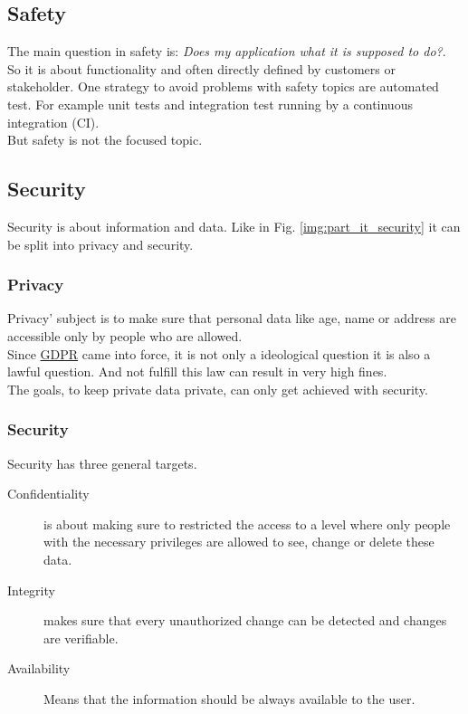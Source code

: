 \subsection{Safety}
\label{chp:intro:sec:definition:ssec:safety}

The main question in safety is: \textit{Does my application what it is supposed to do?}. \\
So it is about functionality and often directly defined by customers or stakeholder. One strategy to avoid problems with safety topics are automated test. For example unit tests and integration test running by a continuous integration (CI). \\
But safety is not the focused topic.

\subsection{Security}
\label{chp:intro:sec:definition:ssec:safety}

Security is about information and data. Like in Fig. \ref{img:part_it_security} it can be split into privacy and security.

\subsubsection{Privacy}
\label{chp:intro:sec:definition:ssec:safety::sss:privacy}

Privacy' subject is to make sure that personal data like age, name or address are accessible only by people who are allowed. \\
Since \hyperref[https://gdpr-info.eu/]{GDPR} came into force, it is not only a ideological question it is also a lawful question. And not fulfill this law can result in very high fines.\\ The goals, to keep private data private, can only get achieved with security. 

\subsubsection{Security}
\label{chp:intro:sec:definition:ssec:safety::sss:security}

Security has three general targets.

\begin{description}
	\item[Confidentiality] is about making sure to restricted the access to a level where only people with the necessary privileges are allowed to see, change or delete these data.
	
	\item[Integrity] makes sure that every unauthorized change can be detected and changes are verifiable.
	
	\item[Availability] Means that the information should be always available to the user.
\end{description} 

